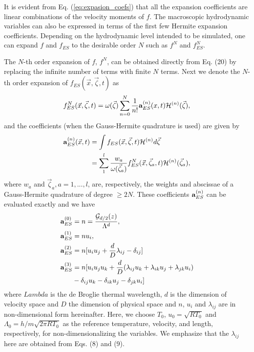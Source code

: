 \documentclass[doublecol]{epl2}
\begin{document}
It is evident from Eq. (\ref{eq:expasion_coefs}) that all the expansion coefficients are linear combinations of the velocity moments of $f$.  The macroscopic hydrodynamic variables can also be expressed in terms of the first few Hermite expansion coefficients.  Depending on the hydrodynamic level intended to be simulated, one can expand $f$ and $f_{ES}$ to the desirable order $N$ such as $f^N$ and $f_{ES}^N$.

The $N$-th order expansion of $f$, $f^N$, can be obtained directly from Eq. (20) by replacing the infinite number of terms with finite $N$ terms.  Next we denote the $N$-th order expansion of $f_{ES}(\vec x,\vec\zeta ,t)$ as
\begin{align}
 f^N_{ES}(\vec x,\vec\zeta ,t) =\omega (\vec\zeta )\sum _{n=0}^N
\frac{1}{n!} {\bf a}^{(n)}_{ES}(x,t) {{\mathcal H}}^{(n)} (\vec\zeta ),
\end{align}
and the coefficients (when the Gauss-Hermite quadrature is used) are given by
\begin{align}
{\bf a}^{(n)}_{ES} (\vec x,t) &=\int f_{ES}(\vec x,\vec\zeta ,t) {{\mathcal H}}^{(n)} d\vec\zeta \nonumber \\
&= \sum_1^l \frac{w_a}{\omega (\vec\zeta_a )} f^N_{ES}(\vec x,\vec \zeta_a ,t) {{\mathcal H}}^{(n)} (\vec\zeta_a ),
\end{align}
where $w_a$ and $\vec \zeta_a, a=1,...,l$, are, respectively, the weights and abscissae of a Gauss-Hermite quadrature of degree $ \ge 2N$.
These coefficients ${\bf a}^{(n)}_{ES}$ can be evaluated exactly and we have
\begin{subequations}
\begin{align}
{\bf a}_{ES}^{(0)} &= n = \frac{ \mathcal{G}_{d/2}(z)}{\Lambda^d}, \\
{\bf a}_{ES}^{(1)} &= n u_{i},  \\
{\bf a}_{ES}^{(2)} &= n [u_{i} u_{j} + \frac{d}{D} \lambda_{i j} - \delta_{i j}] \\
{\bf a}_{ES}^{(3)} &= n [u_{i} u_{j} u_{k} + \frac{d}{D}(\lambda_{i j} u_{k} + \lambda_{i k} u_{j} + \lambda_{j k} u_{i}) \nonumber \\																				 & - \delta_{i j} u_{k}  - \delta_{i k} u_{j}  - \delta_{j k} u_{i} ]
\end{align}
\end{subequations}
where $Lambda$ is the de Broglie thermal wavelength, $d$ is the dimension of velocity space and $D$ the dimension of physical space and $n$, $u_{i}$ and $\lambda_{i j}$ are in non-dimensional form hereinafter. Here, we choose $T_0$, $u_0=\sqrt{ RT_0}$ and $\Lambda_0=h/m\sqrt{2\pi RT_0}$ as the reference temperature, velocity, and length, respectively, for non-dimensionalizing the variables.  We emphasize that the $\lambda_{i j}$ here are obtained from Eqs. (8) and (9).
\end{document}
